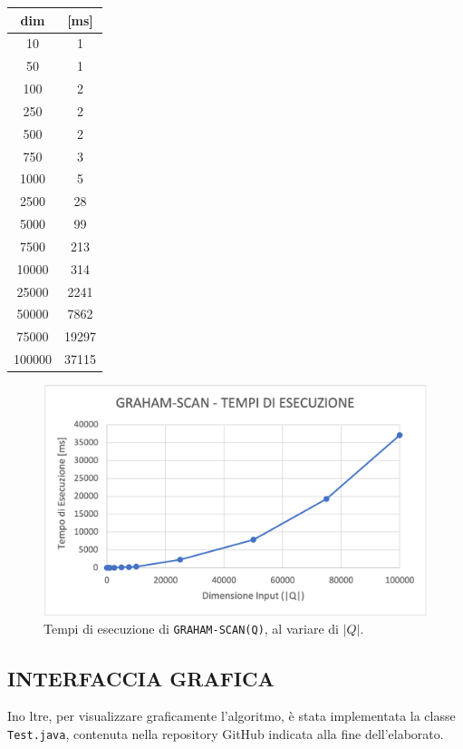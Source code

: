\documentclass[12pt,a4paper]{report}
\begin{document}
\begin{center}
\begin{tabular}{|c|c|} 
 \hline
 dim & [ms]\\
 \hline\hline
 10 & 1\\
 \hline
 50 & 1\\
 \hline
 100 & 2\\
 \hline
 250 & 2\\
 \hline
 500 & 2\\
 \hline
 750 & 3\\
 \hline
 1000 & 5\\
 \hline
 2500 & 28\\
 \hline
 5000 & 99\\
 \hline
 7500 & 213\\
 \hline
 10000 & 314\\
 \hline
 25000 & 2241\\
 \hline
 50000 & 7862\\
 \hline
 75000 & 19297\\
 \hline
 100000 & 37115\\
 \hline
 
\end{tabular}
\end{center}

\begin{figure}[ht]
    \centering
    \includegraphics[width=0.8\linewidth]{datisperimentali.png}
    \caption{Tempi di esecuzione di \texttt{GRAHAM-SCAN(Q)}, al variare di $|Q|$.}
    \label{fig:graficodati}
\end{figure}

\pagebreak

\subsection*{\small{INTERFACCIA GRAFICA}}
Ino ltre, per visualizzare graficamente l'algoritmo, è stata implementata la classe \texttt{Test.java}, contenuta nella repository GitHub indicata alla fine dell'elaborato.\\
\end{document}
